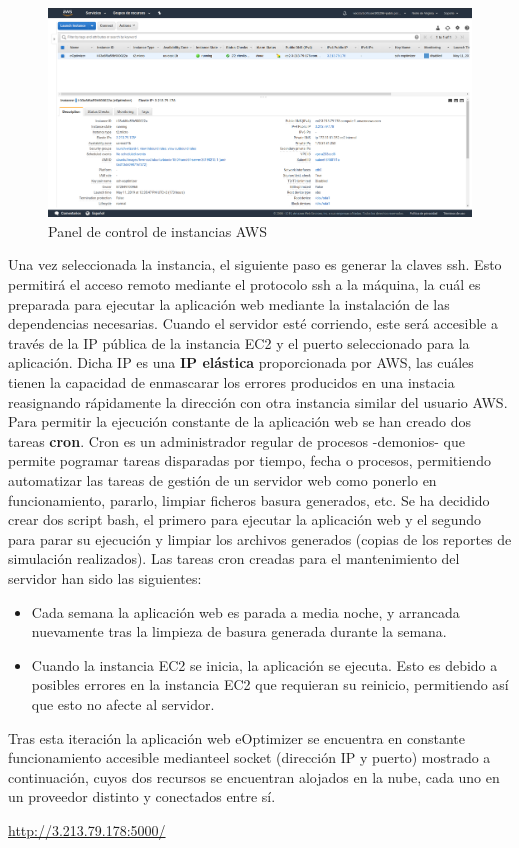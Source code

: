 \begin{figure}[H]
            \centering
            \includegraphics[width=17cm]{figs/aws_control_panel.png}
            \caption{Panel de control de instancias AWS}
            \label{fig:AWSControlPanel}
\end{figure}

Una vez seleccionada la instancia, el siguiente paso es generar la claves ssh. Esto permitirá el acceso remoto mediante el protocolo ssh a la máquina, la cuál es preparada para ejecutar la aplicación web mediante la instalación de las dependencias necesarias. Cuando el servidor esté corriendo, este será accesible a través de la IP pública de la instancia EC2 y el puerto seleccionado para la aplicación. Dicha IP es una \textbf{IP elástica} proporcionada por AWS, las cuáles tienen la capacidad de enmascarar los errores producidos en una instacia reasignando rápidamente la dirección con otra instancia similar del usuario AWS.\\
Para permitir la ejecución constante de la aplicación web se han creado dos tareas \textbf{cron}. Cron es un administrador regular de procesos -demonios- que permite pogramar tareas disparadas por tiempo, fecha o procesos, permitiendo automatizar las tareas de gestión de un servidor web como ponerlo en funcionamiento, pararlo, limpiar ficheros basura generados, etc. Se ha decidido crear dos script bash, el primero para ejecutar la aplicación web y el segundo para parar su ejecución y limpiar los archivos generados (copias de los reportes de simulación realizados). Las tareas cron creadas para el mantenimiento del servidor han sido las siguientes:
\begin{itemize}
\item Cada semana la aplicación web es parada a media noche, y arrancada nuevamente tras la limpieza de basura generada durante la semana.
\item Cuando la instancia EC2 se inicia, la aplicación se ejecuta. Esto es debido a posibles errores en la instancia EC2 que requieran su reinicio, permitiendo así que esto no afecte al servidor.
\end{itemize}

Tras esta iteración la aplicación web eOptimizer se encuentra en constante funcionamiento accesible medianteel socket (dirección IP y puerto) mostrado a continuación, cuyos dos recursos se encuentran alojados en la nube, cada uno en un proveedor distinto y conectados entre sí.\\

\centerline{\url{http://3.213.79.178:5000/}}
